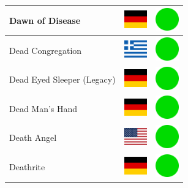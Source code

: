 \documentclass[12pt, a4paper, twoside]{report}
\begin{document}
\begin{center}
\begin{longtable}{|p{5cm}|p{2cm}|p{2cm}|}
 Dawn of Disease                                            & \includegraphics[width=1cm]{../4x3/de} &   \includegraphics[width=1cm]{../likes/y} \\ \hline
 Dead Congregation                                          & \includegraphics[width=1cm]{../4x3/gr} &   \includegraphics[width=1cm]{../likes/y} \\ \hline
 Dead Eyed Sleeper (Legacy)                                 & \includegraphics[width=1cm]{../4x3/de} &   \includegraphics[width=1cm]{../likes/y} \\ \hline
 Dead Man's Hand                                            & \includegraphics[width=1cm]{../4x3/de} &   \includegraphics[width=1cm]{../likes/y} \\ \hline
 Death Angel                                                & \includegraphics[width=1cm]{../4x3/us} &   \includegraphics[width=1cm]{../likes/y} \\ \hline
 Deathrite                                                  & \includegraphics[width=1cm]{../4x3/de} &   \includegraphics[width=1cm]{../likes/y} \\ \hline

\end{longtable}
\end{center}
\end{document}
